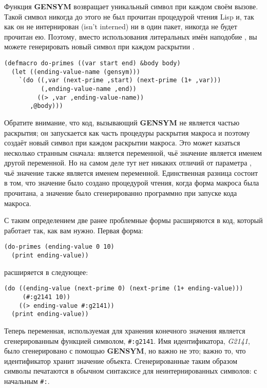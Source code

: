 Функция \textbf{GENSYM} возвращает уникальный символ при каждом своём вызове. Такой символ
никогда до этого не был прочитан процедурой чтения Lisp и, так как он не интернирован
(isn't interned) ни в один пакет, никогда не будет прочитан ею. Поэтому, вместо
использования литеральных имён наподобие , вы можете генерировать новый
символ при каждом раскрытии .

\begin{lstlisting}
(defmacro do-primes ((var start end) &body body)
  (let ((ending-value-name (gensym)))
    `(do ((,var (next-prime ,start) (next-prime (1+ ,var)))
          (,ending-value-name ,end))
         ((> ,var ,ending-value-name))
       ,@body)))
\end{lstlisting}

Обратите внимание, что код, вызывающий \textbf{GENSYM} не является частью раскрытия; он
запускается как часть процедуры раскрытия макроса и поэтому создаёт новый символ при
каждом раскрытии макроса. Это может казаться несколько странным сначала:
 является переменной, чьё значение является именем другой
переменной. Но на самом деле тут нет никаких отличий от параметра , чьё значение
также является именем переменной. Единственная разница состоит в том, что значение
 было создано процедурой чтения, когда форма макроса была прочитана, а значение
 было сгенерированно программно при запуске кода макроса.

С таким определением две ранее проблемные формы расширяются в код, который работает так,
как вам нужно. Первая форма:

\begin{lstlisting}
(do-primes (ending-value 0 10)
  (print ending-value))
\end{lstlisting}

расширяется в следующее:

\begin{lstlisting}
(do ((ending-value (next-prime 0) (next-prime (1+ ending-value)))
     (#:g2141 10))
    ((> ending-value #:g2141))
  (print ending-value))
\end{lstlisting}

Теперь переменная, используемая для хранения конечного значения является сгенерированным
функцией  символом, \lstinline!#:g2141!. Имя идентификатора, \textit{G2141},
было сгенерировано с помощью \textbf{GENSYM}, но важно не это; важно то, что идентификатор
хранит значение объекта. Сгенерированные таким образом символы печатаются в обычном
синтаксисе для неинтернированных символов: с начальным \lstinline!#:!.

